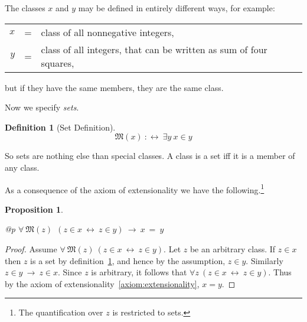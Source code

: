 \documentclass[a4paper,german,10pt,twoside]{book}
\newtheorem{prop}[thm]{Proposition}
\theoremstyle{definition}
\newtheorem{defn}[thm]{Definition}
\theoremstyle{remark}
\begin{document}
The classes $x$ and $y$ may be defined in entirely different ways, for example:
\par
\begin{tabularx}{\linewidth}{rcX}
  $x$ & = & class of all nonnegative integers, \\
  $y$ & = & class of all integers, that can be written as sum of four squares,
\end{tabularx}
\par
but if they have the same members, they are the same class.


\par
Now we specify \emph{sets}.

\begin{defn}[Set Definition]
\label{isSet} \hypertarget{isSet}{}
$$\mathfrak{M}(x)\ :\leftrightarrow \ \exists y\ x \in y$$

\end{defn}

So sets are nothing else than special classes. A class is a set iff it is a member of any class.


\par
As a consequence of the axiom of extensionality we have the following.\footnote{The quantification over $z$ is restricted to sets.}

\begin{prop}
\label{module1:theorem} \hypertarget{module1:theorem}{}
\mbox{}
\begin{longtable}{{@{\extracolsep{\fill}}p{\linewidth}}}
\centering $\forall \ \mathfrak{M}(z)\ \ (z \in x\ \leftrightarrow \ z \in y)\ \rightarrow \ x \ =  \ y$
\end{longtable}

\end{prop}
\begin{proof}
Assume $\forall \ \mathfrak{M}(z) \ ( z \in x \ \leftrightarrow \ z \in y)$. Let $z$ be an arbitrary class. If $z \in x$ then $z$ is a set by definition~\ref{isSet}, and hence by the assumption, $z \in y$. Similarly $z \in y \ \rightarrow \ z \in x$. Since $z$ is arbitrary, it follows that $\forall z \ (z \in x \ \leftrightarrow \ z \in y)$. Thus by the axiom of extensionality~\ref{axiom:extensionality}, $x = y$.
\end{proof}






\backmatter

 \printindex
\end{document}
